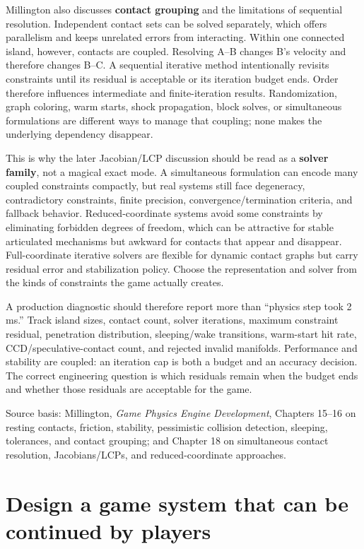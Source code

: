 Millington also discusses \textbf{contact grouping} and the limitations of sequential resolution. Independent contact sets can be solved separately, which offers parallelism and keeps unrelated errors from interacting. Within one connected island, however, contacts are coupled. Resolving A--B changes B's velocity and therefore changes B--C. A sequential iterative method intentionally revisits constraints until its residual is acceptable or its iteration budget ends. Order therefore influences intermediate and finite-iteration results. Randomization, graph coloring, warm starts, shock propagation, block solves, or simultaneous formulations are different ways to manage that coupling; none makes the underlying dependency disappear.

This is why the later Jacobian/LCP discussion should be read as a \textbf{solver family}, not a magical exact mode. A simultaneous formulation can encode many coupled constraints compactly, but real systems still face degeneracy, contradictory constraints, finite precision, convergence/termination criteria, and fallback behavior. Reduced-coordinate systems avoid some constraints by eliminating forbidden degrees of freedom, which can be attractive for stable articulated mechanisms but awkward for contacts that appear and disappear. Full-coordinate iterative solvers are flexible for dynamic contact graphs but carry residual error and stabilization policy. Choose the representation and solver from the kinds of constraints the game actually creates.

A production diagnostic should therefore report more than ``physics step took 2 ms.'' Track island sizes, contact count, solver iterations, maximum constraint residual, penetration distribution, sleeping/wake transitions, warm-start hit rate, CCD/speculative-contact count, and rejected invalid manifolds. Performance and stability are coupled: an iteration cap is both a budget and an accuracy decision. The correct engineering question is which residuals remain when the budget ends and whether those residuals are acceptable for the game.

Source basis: Millington, \emph{Game Physics Engine Development}, Chapters 15--16 on resting contacts, friction, stability, pessimistic collision detection, sleeping, tolerances, and contact grouping; and Chapter 18 on simultaneous contact resolution, Jacobians/LCPs, and reduced-coordinate approaches.

\section{Design a game system that can be continued by players}\label{06-engine-ii-ch046-design-a-game-system-that-can-be-continued-by-players}


